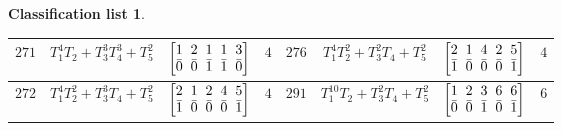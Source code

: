 \documentclass[pdftex]{sigma}%
\theoremstyle{definition}
\newtheorem{class-list}[thm]{Classification list}
\numberwithin{equation}{section}
\begin{document}
\begin{class-list}
\begin{table}[h!]
\begin{tabu}{c|c|c|c||c|c|c|c}
\\
\hline
${271}$&${T_{1}^{4}T_{2}+T_{3}^{3}T_{4}^{3}+T_{5}^{2}}$
&$\arraycolsep=1mm\begin{bmatrix}{1} & {2} & {1} & {1} & {3} \\ {\bar{0}} & {\bar{0}} & {\bar{1}} & {\bar{1}} & {\bar{0}}\end{bmatrix}$&${4}$
&${276}$&${T_{1}^{4}T_{2}^{2}+T_{3}^{2}T_{4}+T_{5}^{2}}$
&$\arraycolsep=1mm\begin{bmatrix}{2} & {1} & {4} & {2} & {5} \\ {\bar{1}} & {\bar{0}} & {\bar{0}} & {\bar{0}} & {\bar{1}}\end{bmatrix}$&${4}$
\\
\hline
${272}$&${T_{1}^{4}T_{2}^{2}+T_{3}^{3}T_{4}+T_{5}^{2}}$
&$\arraycolsep=1mm\begin{bmatrix}{2} & {1} & {2} & {4} & {5} \\ {\bar{1}} & {\bar{0}} & {\bar{0}} & {\bar{0}} & {\bar{1}}\end{bmatrix}$&${4}$
&${291}$&${T_{1}^{10}T_{2}+T_{3}^{2}T_{4}+T_{5}^{2}}$
&$\arraycolsep=1mm\begin{bmatrix}{1} & {2} & {3} & {6} & {6} \\ {\bar{0}} & {\bar{0}} & {\bar{1}} & {\bar{0}} & {\bar{1}}\end{bmatrix}$&${6}$
\\
\hline
\end{tabu}%
\end{table}



\end{class-list}
\end{document}
